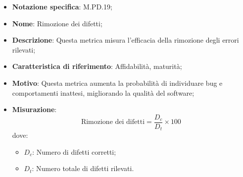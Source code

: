\begin{itemize}
    \item \textbf{Notazione specifica}: M.PD.19;
    \item \textbf{Nome}: Rimozione dei difetti;
    \item \textbf{Descrizione}: Questa metrica misura l'efficacia della rimozione degli errori rilevati;
    \item \textbf{Caratteristica di riferimento}: Affidabilità, maturità;
    \item \textbf{Motivo}: Questa metrica aumenta la probabilità di individuare bug e comportamenti inattesi, migliorando la qualità del software;
    \item \textbf{Misurazione}:
    \[
        \text{Rimozione dei difetti} = \frac{D_{c}}{D_{t}} \times 100
    \]
    dove:
    \begin{itemize}
        \item $D_{c}$: Numero di difetti corretti;
        \item $D_{t}$: Numero totale di difetti rilevati.
    \end{itemize}
\end{itemize}